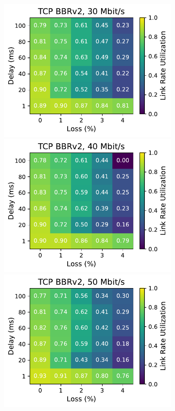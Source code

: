 \begin{figure}[ht]
\begin{subfigure}[b]{0.22\linewidth}
        \includegraphics[width=\linewidth,trim={0 0 2cm 0},clip]{figures/heatmaps/heatmap_tcp_bbr2_30mbps.pdf}
        \includegraphics[width=\linewidth,trim={0 0 2cm 0},clip]{figures/heatmaps/heatmap_tcp_bbr2_40mbps.pdf}
        \includegraphics[width=\linewidth,trim={0 0 2cm 0},clip]{figures/heatmaps/heatmap_tcp_bbr2_50mbps.pdf}

\end{subfigure}
\end{figure}
